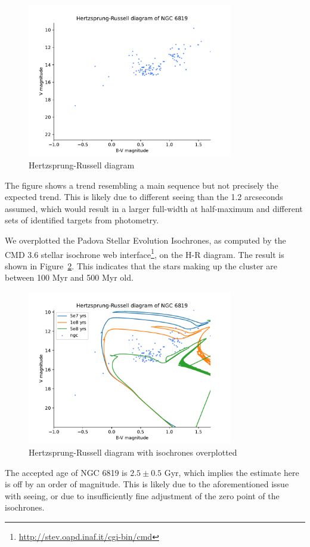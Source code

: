 \documentclass{article}
\begin{document}
    \begin{figure}
        \centering
        \includegraphics[width=0.8\textwidth]{hr_diagram.pdf}
        \caption{Hertzsprung-Russell diagram}
        \label{fig:hr}
    \end{figure}

    The figure shows a trend resembling a main sequence but not precisely the expected trend. This is likely due to different seeing than the 1.2 arcseconds assumed, which would result in a larger full-width at half-maximum and different sets of identified targets from photometry.

    We overplotted the Padova Stellar Evolution Isochrones, as computed by the CMD 3.6 stellar isochrone web interface\footnote{\href{http://stev.oapd.inaf.it/cgi-bin/cmd}{http://stev.oapd.inaf.it/cgi-bin/cmd}}, on the H-R diagram. The result is shown in Figure~\ref{fig:isochrones}. This indicates that the stars making up the cluster are between 100 Myr and 500 Myr old.

    \begin{figure}
        \centering
        \includegraphics[width=0.8\textwidth]{isochrones.pdf}
        \caption{Hertzsprung-Russell diagram with isochrones overplotted}
        \label{fig:isochrones}
    \end{figure}

    The accepted age of NGC 6819 is $2.5 \pm 0.5$ Gyr, which implies the estimate here is off by an order of magnitude. This is likely due to the aforementioned issue with seeing, or due to insufficiently fine adjustment of the zero point of the isochrones.
\end{document}
